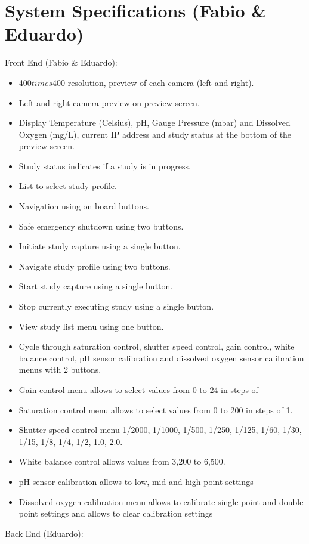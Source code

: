 \section{System Specifications (Fabio \& Eduardo)}
Front End (Fabio \& Eduardo):
\begin{itemize}
	\item 400$times$400 resolution, preview of each camera (left and right).
	\item Left and right camera preview on preview screen.
	\item Display Temperature (Celsius), pH, Gauge Pressure (mbar) and Dissolved Oxygen (mg/L), current IP address and study status at the bottom of the preview screen.
	\item Study status indicates if a study is in progress.
	\item List to select study profile.
	\item Navigation using on board buttons.
	\item Safe emergency shutdown using two buttons.
	\item Initiate study capture using a single button.
	\item Navigate study profile using two buttons.
	\item Start study capture using a single button.
	\item Stop currently executing study using a single button.
	\item View study list menu using one button.
	\item Cycle through saturation control, shutter speed control, gain control, white balance control, pH sensor calibration and dissolved oxygen sensor calibration menus with 2 buttons.
	\item Gain control menu allows to select values from 0 to 24 in steps of
	\item Saturation control menu allows to select values from 0 to 200 in steps of 1.
	\item Shutter speed control menu 1/2000, 1/1000, 1/500, 1/250, 1/125, 1/60, 1/30, 1/15, 1/8, 1/4, 1/2, 1.0, 2.0.
	\item White balance control allows values from 3,200 to 6,500.
	\item pH sensor calibration allows to low, mid and high point settings
	\item Dissolved oxygen calibration menu allows to calibrate single point and double point settings and allows to clear calibration settings
\end{itemize}
Back End (Eduardo):
